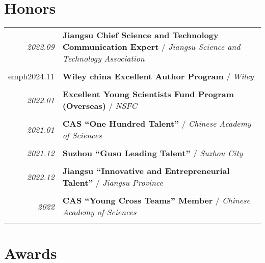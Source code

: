 \documentclass[paper=a4,fontsize=11pt]{scrartcl}
\begin{document}
\section*{Honors}

\begin{tabular}{r|p{11cm}}
	
	\emph{2022.09} & \textbf{Jiangsu Chief Science and Technology Communication Expert} / \emph{Jiangsu Science and Technology Association}\\
	\multicolumn{2}{c}{} \\
	
	emph{2024.11} & \textbf{Wiley china Excellent Author Program} / \emph{Wiley}\\
	\multicolumn{2}{c}{} \\

	\emph{2022.01} & \textbf{Excellent Young Scientists Fund Program (Overseas)} / \emph{NSFC}\\
	\multicolumn{2}{c}{} \\
	
	\emph{2021.01} & \textbf{CAS ``One Hundred Talent''} / \emph{Chinese Academy of Sciences}\\
	\multicolumn{2}{c}{} \\
	
	
	\emph{2021.12} & \textbf{Suzhou ``Gusu Leading Talent''} / \emph{Suzhou City}\\
	\multicolumn{2}{c}{} \\

	\emph{2022.12} & \textbf{Jiangsu ``Innovative and Entrepreneurial Talent''} / \emph{Jiangsu Province}\\
	\multicolumn{2}{c}{} \\
	
	\emph{2022} & \textbf{CAS ``Young Cross Teams'' Member} / \emph{Chinese Academy of Sciences}\\
	\multicolumn{2}{c}{}
	
	
\end{tabular}


\section*{Awards}
\end{document}
